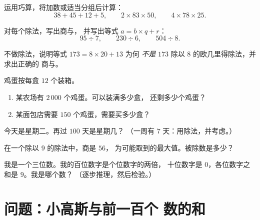 \begin{exercise}[$\star$]\label{exo:g6:wholes:6}
运用巧算，将加数或适当分组后计算：
\[
38 + 45 + 12 + 5, \qquad
2 \times 83 \times 50, \qquad
4 \times 78 \times 25 .
\]
\end{exercise}

\begin{exercise}[$\star$]\label{exo:g6:wholes:7}
对每个除法，写出商与，
并写出等式 $a = b \times q + r$：
\[
95 \div 7, \qquad
230 \div 6, \qquad
504 \div 8 .
\]
\end{exercise}

\begin{exercise}[$\star$]\label{exo:g6:wholes:8}
不做除法，说明等式 $173 = 8 \times 20 + 13$ 为何
\emph{不是} $173$ 除以 $8$ 的欧几里得除法，并求出正确的
商与。
\end{exercise}

\begin{exercise}[$\star\star$]\label{exo:g6:wholes:9}
鸡蛋按每盒 $12$ 个装箱。
\begin{enumerate}
  \item 某农场有 $2\,000$ 个鸡蛋。可以装满多少盒，
        还剩多少个鸡蛋？
  \item 某面包店需要 $150$ 个鸡蛋，需要买多少盒？
\end{enumerate}
\end{exercise}

\begin{exercise}[$\star\star$]\label{exo:g6:wholes:10}
今天是星期二。再过 $100$ 天是星期几？
（一周有 $7$ 天：用除法，并考虑。）
\end{exercise}

\begin{exercise}[$\star\star$]\label{exo:g6:wholes:11}
在一个除以 $9$ 的除法中，商是 $56$，
为可能取到的最大值。被除数是多少？
\end{exercise}

\begin{exercise}[$\star\star\star$]\label{exo:g6:wholes:12}
我是一个三位数。我的百位数字是个位数字的两倍，
十位数字是 $0$，各位数字之和是 $9$。我是哪个数？
（逐步推理，然后检验。）
\end{exercise}

\section{问题：小高斯与前一百个
数的和}

